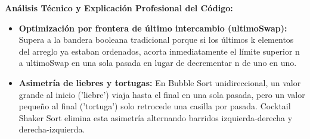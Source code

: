\documentclass[11pt,letterpaper]{article}
\begin{document}
\noindent\textbf{\color{ipnguinda}Análisis Técnico y Explicación Profesional del Código:}\par\vspace{-2pt}
\begin{itemize}
\setlength{\itemsep}{2pt}\setlength{\parskip}{0pt}
  \item \textbf{Optimización por frontera de último intercambio (ultimoSwap): }Supera a la bandera booleana tradicional porque si los últimos k elementos del arreglo ya estaban ordenados, acorta inmediatamente el límite superior n a ultimoSwap en una sola pasada en lugar de decrementar n de uno en uno.
  \item \textbf{Asimetría de liebres y tortugas: }En Bubble Sort unidireccional, un valor grande al inicio ('liebre') viaja hasta el final en una sola pasada, pero un valor pequeño al final ('tortuga') solo retrocede una casilla por pasada. Cocktail Shaker Sort elimina esta asimetría alternando barridos izquierda-derecha y derecha-izquierda.
\end{itemize}
\end{document}
